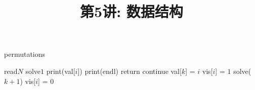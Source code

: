 \documentclass[a4paper, justified]{tufte-handout}
\title{第5讲: 数据结构}
\date{\zhtoday} %
\begin{document}
\maketitle
\noplagiarism %
\begin{abstract}
  \begin{center}{}
  \end{center}
\end{abstract}
\beginrequired

\begin{problem}
\end{problem}

\begin{solution}
  \noindent
  \begin{algorithm}
    \caption{ permutations}\label{euclid}
    \begin{algorithmic}[1]
      \State read{$N$}
      \State solve{$1$}
      \State print(val[$i$])
      \State print(endl)
      \EndFor
      \State return
      \EndIf
      \State continue
      \EndIf
      \State val[$k$] = $i$
      \State vis[$i$] = $1$
      \State solve($k + 1$)
      \State vis[$i$] = 0
      \EndFor
      \EndProcedure
    \end{algorithmic}
  \end{algorithm}
\end{solution}

\begin{problem}
\end{problem}
\end{document}
